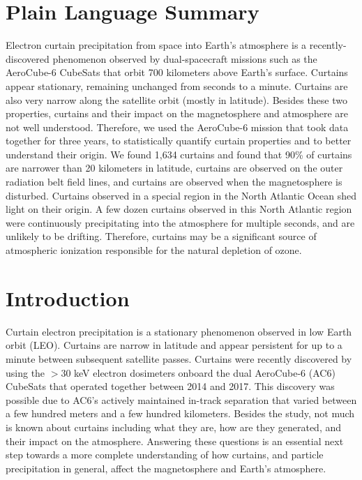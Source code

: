 \documentclass[draft]{agujournal2019}
\begin{document}
\section{Plain Language Summary}
Electron curtain precipitation from space into Earth's atmosphere is a recently-discovered phenomenon observed by dual-spacecraft missions such as the AeroCube-6 CubeSats that orbit 700 kilometers above Earth's surface. Curtains appear stationary, remaining unchanged from seconds to a minute. Curtains are also very narrow along the satellite orbit (mostly in latitude). Besides these two properties, curtains and their impact on the magnetosphere and atmosphere are not well understood. Therefore, we used the AeroCube-6 mission that took data together for three years, to statistically quantify curtain properties and to better understand their origin. We found 1,634 curtains and found that 90\% of curtains are narrower than 20 kilometers in latitude, curtains are observed on the outer radiation belt field lines, and curtains are observed when the magnetosphere is disturbed. Curtains observed in a special region in the North Atlantic Ocean shed light on their origin. A few dozen curtains observed in this North Atlantic region were continuously precipitating into the atmosphere for multiple seconds, and are unlikely to be drifting. Therefore, curtains may be a significant source of atmospheric ionization responsible for the natural depletion of ozone.

\section{Introduction} \label{intro}
Curtain electron precipitation is a stationary phenomenon observed in low Earth orbit (LEO). Curtains are narrow in latitude and appear persistent for up to a minute between subsequent satellite passes. Curtains were recently discovered by  using the $> 30$ keV electron dosimeters onboard the dual AeroCube-6 (AC6) CubeSats that operated together between 2014 and 2017. This discovery was possible due to AC6's actively maintained in-track separation that varied between a few hundred meters and a few hundred kilometers. Besides the  study, not much is known about curtains including what they are, how are they generated, and their impact on the atmosphere. Answering these questions is an essential next step towards a more complete understanding of how curtains, and particle precipitation in general, affect the magnetosphere and Earth's atmosphere.
\end{document}
